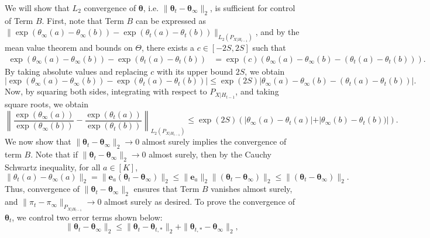 \documentclass{article}
\begin{document}
\begin{appendices}
We will show that $L_2$ convergence of $\bm\theta$, i.e. $\|\bm\theta_t - \bm\theta_{\infty} \|_2$, is sufficient for control of Term $B$. First, note that Term $B$ can be expressed as $\|\exp(\theta_\infty(a) - \theta_\infty(b))  - \exp(\theta_t(a) - \theta_t(b))\|_{L_2(P_{X|H_{t-1}})}$, and by the mean value theorem and bounds on $\Theta$, there exists a $c \in [-2S, 2S]$ such that 
\begin{align}
    \exp(\theta_\infty(a) - \theta_\infty(b))  - \exp(\theta_t(a) - \theta_t(b)) &= \exp(c) \left(\theta_\infty(a) - \theta_\infty(b) - (\theta_t(a) - \theta_t(b)) \right).
\end{align}
By taking absolute values and replacing $c$ with its upper bound $2S$, we obtain
\begin{equation}
    \left|\exp(\theta_\infty(a) - \theta_\infty(b))  - \exp(\theta_t(a) - \theta_t(b))\right| \leq \exp(2S) \left|\theta_\infty(a) - \theta_\infty(b) - (\theta_t(a) - \theta_t(b)) \right|.
\end{equation}
Now, by squaring both sides, integrating with respect to $P_{X|H_{t-1}}$, and taking square roots, we obtain 
\begin{equation}
    \left\|\frac{\exp(\theta_\infty(a))}{\exp(\theta_\infty(b))} - \frac{\exp(\theta_t(a))}{\exp(\theta_t(b))}  \right\|_{L_2(P_{X|H_{t-1}})} \leq \exp(2S) \left(\left|\theta_\infty(a) - \theta_t(a)| + |\theta_\infty(b)  - \theta_t(b)) \right|\right). 
\end{equation}
We now show that $\|\bm{\theta}_t - \bm{\theta}_\infty \|_2 \rightarrow 0$ almost surely implies the convergence of term $B$. Note that if $\|\bm{\theta}_t - \bm{\theta}_\infty \|_2 \rightarrow 0$ almost surely, then by the Cauchy Schwartz inequality, for all $a \in [K]$,
\begin{equation}
    \|{\theta}_t(a) - \theta_\infty(a)\|_2 = \|\bm{e}_a\left(\bm{\theta}_t - \bm\theta_\infty\right)\|_2 \leq \| \bm{e}_a\|_2\|\left(\bm{\theta}_t - \bm\theta_\infty\right) \|_2 \leq \|\left(\bm{\theta}_t - \bm\theta_\infty\right) \|_2.
\end{equation}
Thus, convergence of $\|\bm{\theta}_t - \bm{\theta}_\infty \|_2$ ensures that Term $B$ vanishes almost surely, and $\|\pi_t - \pi_\infty \|_{P_{X|H_{t-1}}} \rightarrow 0$ almost surely as desired. To prove the convergence of $\bm{\theta}_t$, we control two error terms shown below:
\begin{equation}\label{eq:main_ineq}
    \| \bm{\theta}_t-\bm{\theta}_{\infty}\|_2 \leq \| \bm{\theta}_t - \bm{\theta}_{t,*}\|_2+  \|\bm{\theta}_{t,*} - \bm{\theta}_{\infty} \|_2,

\end{equation}
\end{appendices}
\end{document}
